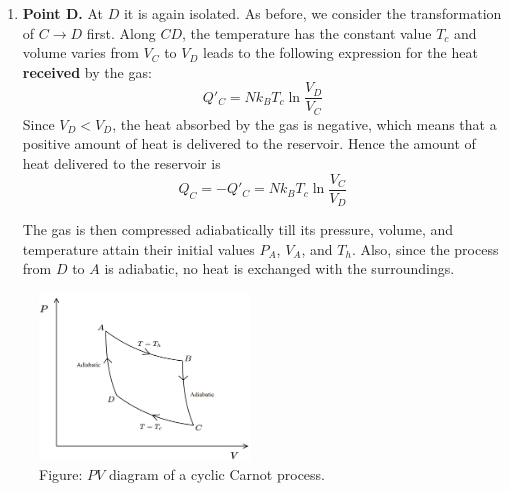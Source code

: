 \documentclass[../../../Main.tex]{subfiles}
\begin{document}
\begin{enumerate}
    \item \textbf{Point D.} At $ D$ it is again isolated. As before, we consider the transformation of $C\rightarrow D$ first. Along $CD$, the temperature has the constant value $T_c$ and volume varies from $V_C$ to $V_D$ leads to the following expression for the heat \textbf{received} by the gas:
    \begin{equation*}
        Q'_C=Nk_BT_c\ln \frac{V_D}{V_C}
    \end{equation*}
    Since $V_D < V_D$, the heat absorbed by the gas is negative, which means that a positive amount of heat is delivered to the reservoir. Hence the amount of heat delivered to the reservoir is 
    \begin{equation*}
        Q_C=-Q'_C=Nk_BT_c\ln\frac{V_C}{V_D}
    \end{equation*}
    
    The gas is then compressed adiabatically till its pressure, volume, and temperature attain their initial values $P_A$, $V_A$, and $T_h$. Also, since the process from $D$ to $A$ is adiabatic, no heat is exchanged with the surroundings. 
\end{enumerate}

\begin{figure}
    \centering
    \includegraphics[width=0.5\textwidth]{../../../Rss/Themodynamics/KeyConcepts/CylicCarnot.png}
    \caption*{Figure: $PV$ diagram of a cyclic Carnot process.}
\end{figure}
\end{document}
